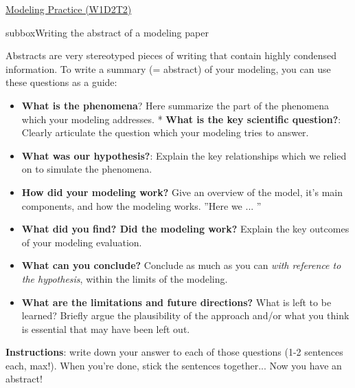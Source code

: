 \begin{textbox}{\href{https://compneuro.neuromatch.io/tutorials/W1D2_ModelingPractice/W1D2_Intro.html}{Modeling Practice  (W1D2T2)} }

\begin{subbox}{subbox}{Writing the abstract of a modeling paper
}
\scriptsize
 
Abstracts are very stereotyped pieces of writing that contain highly condensed information. To write a summary (= abstract) of your modeling, you can use these questions as a guide: 
\begin{itemize}
    \item 
\textbf{What is the phenomena}?  Here summarize the part of the phenomena which your modeling addresses.
* \textbf{What is the key scientific question?}:  Clearly articulate the question which your modeling tries to answer.
\item \textbf{What was our hypothesis?}:  Explain the key relationships which we relied on to simulate the phenomena.
\item \textbf{How did your modeling work?} Give an overview of the model, it's main components, and how the modeling works.  ''Here we ... ''
\item \textbf{What did you find? Did the modeling work?} Explain the key outcomes of your modeling evaluation. 
\item \textbf{What can you conclude?} Conclude as much as you can \textit{with reference to the hypothesis}, within the limits of the modeling.  
\item \textbf{What are the limitations and future directions?} What is left to be learned? Briefly argue the plausibility of the approach and/or what you think is essential that may have been left out.
\end{itemize}


\textbf{Instructions}: write down your answer to each of those questions (1-2 sentences each, max!). When you're done, stick the sentences together... Now you have an abstract!

\end{subbox}
\end{textbox}

